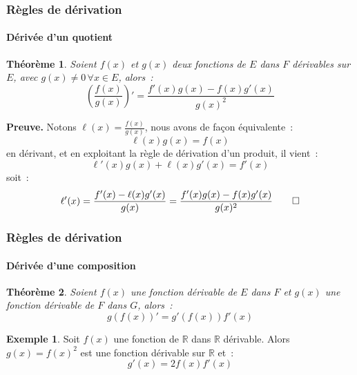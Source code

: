 \documentclass[10pt,notheorems]{beamer}
\theoremstyle{plain}
\newtheorem{theorem}{Théorème}
\theoremstyle{definition} %
\newtheorem{example}{Exemple}
\begin{document}
\begin{frame}
  \frametitle{Règles de dérivation}
  \framesubtitle{Dérivée d'un quotient}
  \hypertarget{slide_derivee_quotient_1}{}

  \begin{theorem}
    Soient $f(x)$ et $g(x)$ deux fonctions de $E$ dans $F$ dérivables sur $E$, avec $g(x)\neq 0\,\forall x\in E$, alors~:
    \[
      \left(\frac{f(x)}{g(x)}\right)' = \frac{f'(x)g(x) - f(x)g'(x)}{g(x)^2}
    \]
  \end{theorem}

  \bigskip

  {\small \textbf{Preuve.} Notons $\ell(x) = \frac{f(x)}{g(x)}$, nous avons de façon équivalente~:
    \[
      \ell(x)g(x) = f(x)
    \]
    en dérivant, et en exploitant la règle de dérivation d'un produit, il vient~:
    \[
      \ell'(x)g(x)+\ell(x)g'(x) = f'(x)
    \]
    soit~:
    \[
      \ell'(x) = \frac{f'(x)-\ell(x)g'(x)}{g(x)} = \frac{f'(x)g(x)-f(x)g'(x)}{g(x)^2} \qed
    \]
  }

\end{frame}


\begin{frame}
  \frametitle{Règles de dérivation}
  \framesubtitle{Dérivée d'une composition}
  \hypertarget{slide_derivee_composition_1}{}

  \begin{theorem}\label{thm:composition}
    Soient $f(x)$ une fonction dérivable de $E$ dans $F$ et $g(x)$ une fonction dérivable de $F$ dans $G$, alors~:
    \[
      g(f(x))' = g'(f(x))f'(x)
    \]
  \end{theorem}

  \bigskip

  \begin{example}
    Soit $f(x)$ une fonction de $\mathbb R$ dans $\mathbb R$ dérivable. Alors $g(x) = f(x)^2$ est une fonction dérivable sur $\mathbb R$ et~:
    \[
      g'(x) = 2f(x)f'(x)
    \]
  \end{example}

\end{frame}
\end{document}

